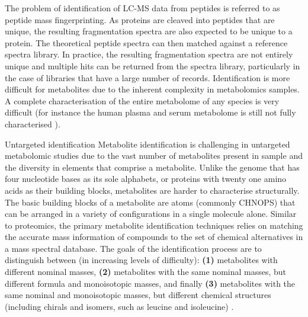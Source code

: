 The problem of identification of LC-MS data from peptides is referred to as peptide mass fingerprinting. As proteins are cleaved into peptides that are unique, the resulting fragmentation spectra are also expected to be unique to a protein. The theoretical peptide spectra can then matched against a reference spectra library. In practice, the resulting fragmentation spectra are not entirely unique and multiple hits can be returned from the spectra library, particularly in the case of libraries that have a large number of records. Identification is more difficult for metabolites due to the inherent complexity in metabolomics samples. A complete characterisation of the entire metabolome of any species is very difficult (for instance the human plasma and serum metabolome is still not fully characterised \cite{dunn2011procedures}). 

Untargeted identification Metabolite identification is challenging in untargeted metabolomic studies due to the vast number of metabolites present in sample and the diversity in elements that comprise a metabolite. Unlike the genome that has four nucleotide bases as its sole alphabets, or proteins with twenty one amino acids as their building blocks, metabolites are harder to characterise structurally. The basic building blocks of a metabolite are atoms (commonly CHNOPS) that can be arranged in a variety of configurations in a single molecule alone. Similar to proteomics, the primary metabolite identification techniques relies on matching the accurate mass information of compounds to the set of chemical alternatives in a mass spectral database. The goals of the identification process are to distinguish between (in increasing levels of difficulty): \textbf{(1)} metabolites with different nominal masses, \textbf{(2)} metabolites with the same nominal masses, but different formula and monoisotopic masses, and finally \textbf{(3)} metabolites with the same nominal and monoisotopic masses, but different chemical structures (including chirals and isomers, such as leucine and isoleucine) \cite{Dunn2012}.

